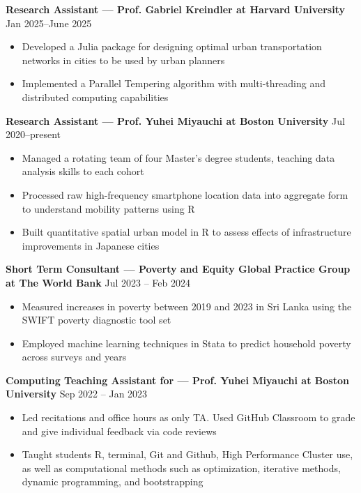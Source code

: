 \documentclass[10pt]{article}
\newenvironment{customitemize}
{ \begin{itemize}[leftmargin=\parindent, topsep = 0.2pt, itemsep = -3pt] }
{\end{itemize} }
\begin{document}
\noindent \textbf{Research Assistant --- Prof. Gabriel Kreindler at Harvard University}  \hfill Jan 2025--June 2025 
\begin{customitemize}
	\item Developed a Julia package for designing optimal urban transportation networks in cities to be used by urban planners
	\item Implemented a Parallel Tempering algorithm with multi-threading and distributed computing capabilities
\end{customitemize}


\noindent \textbf{Research Assistant --- Prof. Yuhei Miyauchi at Boston University}  \hfill Jul 2020--present 
\begin{customitemize}
	\item Managed a rotating team of four Master's degree students, teaching data analysis skills to each cohort
	\item Processed raw high-frequency smartphone location data into aggregate form to understand mobility patterns using R
	\item Built quantitative spatial urban model in R to assess effects of infrastructure improvements in Japanese cities
\end{customitemize}

\noindent \textbf{Short Term Consultant --- Poverty and Equity Global Practice Group at The World Bank}  \hfill Jul 2023 -- Feb 2024
\begin{customitemize}
	\item Measured increases in poverty between 2019 and 2023 in Sri Lanka using the SWIFT poverty diagnostic tool set
	\item Employed machine learning techniques in Stata to predict household poverty across surveys and years
\end{customitemize}

\noindent \textbf{Computing Teaching Assistant for --- Prof. Yuhei Miyauchi at Boston University}  \hfill Sep 2022 -- Jan 2023
\begin{customitemize}
	\item Led recitations and office hours as only TA. Used GitHub Classroom to grade and give individual feedback via code reviews
	\item Taught students R, terminal, Git and Github, High Performance Cluster use, as well as computational methods such as optimization, iterative methods, dynamic programming, and bootstrapping 
\end{customitemize}
\end{document}
